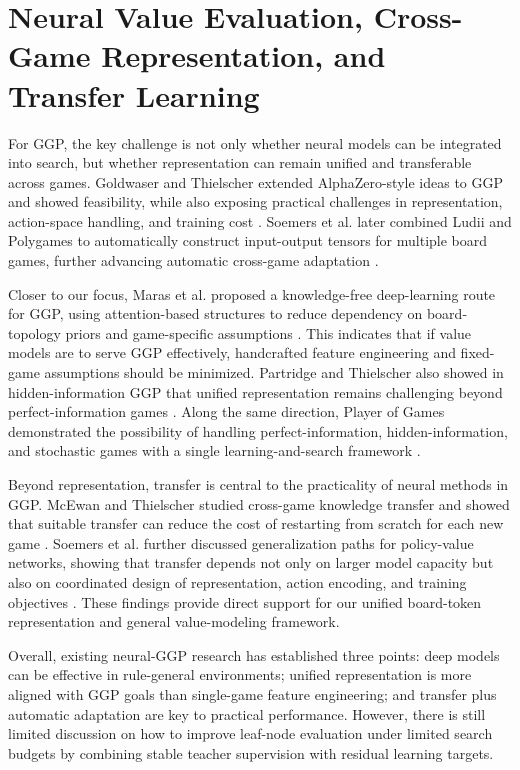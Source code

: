\section{Neural Value Evaluation, Cross-Game Representation, and Transfer Learning}

For GGP, the key challenge is not only whether neural models can be integrated into search, but whether representation can remain unified and transferable across games. Goldwaser and Thielscher extended AlphaZero-style ideas to GGP and showed feasibility, while also exposing practical challenges in representation, action-space handling, and training cost \cite{goldwaser2020deep}. Soemers et al. later combined Ludii and Polygames to automatically construct input-output tensors for multiple board games, further advancing automatic cross-game adaptation \cite{soemers2021ludii}.

Closer to our focus, Maras et al. proposed a knowledge-free deep-learning route for GGP, using attention-based structures to reduce dependency on board-topology priors and game-specific assumptions \cite{maras2024fast}. This indicates that if value models are to serve GGP effectively, handcrafted feature engineering and fixed-game assumptions should be minimized. Partridge and Thielscher also showed in hidden-information GGP that unified representation remains challenging beyond perfect-information games \cite{partridge2022hidden}. Along the same direction, Player of Games demonstrated the possibility of handling perfect-information, hidden-information, and stochastic games with a single learning-and-search framework \cite{schmid2021player}.

Beyond representation, transfer is central to the practicality of neural methods in GGP. McEwan and Thielscher studied cross-game knowledge transfer and showed that suitable transfer can reduce the cost of restarting from scratch for each new game \cite{mcewan2022knowledge}. Soemers et al. further discussed generalization paths for policy-value networks, showing that transfer depends not only on larger model capacity but also on coordinated design of representation, action encoding, and training objectives \cite{soemers2023transfer}. These findings provide direct support for our unified board-token representation and general value-modeling framework.

Overall, existing neural-GGP research has established three points: deep models can be effective in rule-general environments; unified representation is more aligned with GGP goals than single-game feature engineering; and transfer plus automatic adaptation are key to practical performance. However, there is still limited discussion on how to improve leaf-node evaluation under limited search budgets by combining stable teacher supervision with residual learning targets.

